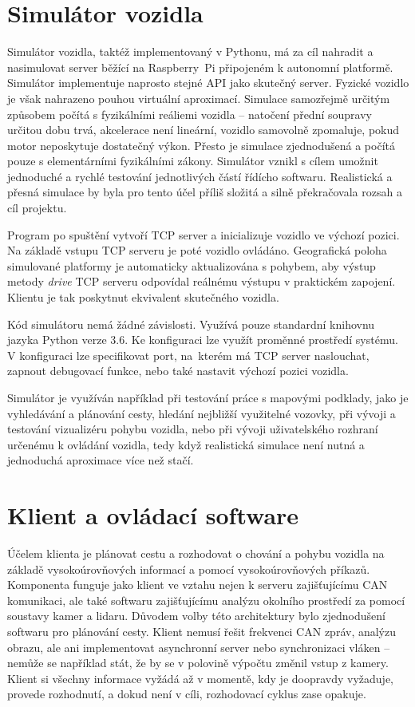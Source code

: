 \documentclass[czech, bachelor]{diploma}
\begin{document}
\chapter{Simulátor vozidla}

Simulátor vozidla, taktéž implementovaný v Pythonu, má za cíl nahradit a nasimulovat server běžící na Raspberry~Pi připojeném
k autonomní platformě. Simulátor implementuje naprosto stejné API jako skutečný server. Fyzické vozidlo je však nahrazeno pouhou
virtuální aproximací. Simulace samozřejmě určitým způsobem počítá s fyzikálními reáliemi vozidla -- natočení přední soupravy
určitou dobu trvá, akcelerace není lineární, vozidlo samovolně zpomaluje, pokud motor neposkytuje dostatečný výkon. Přesto je
simulace zjednodušená a počítá pouze s elementárními fyzikálními zákony. Simulátor vznikl s cílem umožnit jednoduché a rychlé
testování jednotlivých částí řídícho softwaru. Realistická a přesná simulace by byla pro tento účel příliš složitá a silně
překračovala rozsah a cíl projektu.

Program po spuštění vytvoří TCP server a inicializuje vozidlo ve výchozí pozici. Na základě vstupu TCP serveru je poté vozidlo
ovládáno. Geografická poloha simulované platformy je automaticky aktualizována s pohybem, aby výstup metody \emph{drive} TCP
serveru odpovídal reálnému výstupu v praktickém zapojení. Klientu je tak poskytnut ekvivalent skutečného vozidla.

Kód simulátoru nemá žádné závislosti. Využívá pouze standardní knihovnu jazyka Python verze 3.6. Ke konfiguraci lze využít
proměnné prostředí systému. V konfiguraci lze specifikovat port, na~kterém má TCP server naslouchat, zapnout debugovací funkce,
nebo také nastavit výchozí pozici vozidla.

Simulátor je využíván například při testování práce s mapovými podklady, jako je vyhledávání a plánování cesty, hledání nejbližší
využitelné vozovky, při vývoji a testování vizualizéru pohybu vozidla, nebo při vývoji uživatelského rozhraní určenému k ovládání
vozidla, tedy když realistická simulace není nutná a jednoduchá aproximace více než stačí.

\chapter{Klient a ovládací software}

Účelem klienta je plánovat cestu a rozhodovat o chování a pohybu vozidla na základě vysokoúrovňových informací a pomocí
vysokoúrovňových příkazů. Komponenta funguje jako klient ve vztahu nejen k serveru zajišťujícímu CAN komunikaci, ale také
softwaru zajišťujícímu analýzu okolního prostředí za pomocí soustavy kamer a lidaru. Důvodem volby této architektury bylo
zjednodušení softwaru pro plánování cesty. Klient nemusí řešit frekvenci CAN zpráv, analýzu obrazu, ale ani implementovat
asynchronní server nebo synchronizaci vláken -- nemůže se například stát, že by se v polovině výpočtu změnil vstup z kamery.
Klient si všechny informace vyžádá až v momentě, kdy je doopravdy vyžaduje, provede rozhodnutí, a dokud není v cíli, rozhodovací
cyklus zase opakuje.
\end{document}
